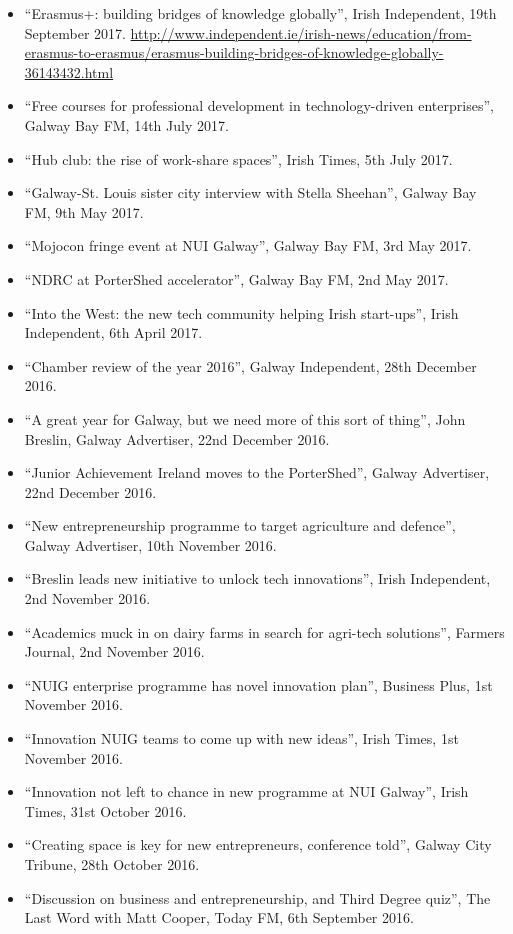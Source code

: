 \documentclass[10pt,a4paper]{res} %
\begin{document}
\begin{resume}
{\begin{itemize}
\item ``Erasmus+: building bridges of knowledge globally'', Irish Independent, 19th September 2017. \url{http://www.independent.ie/irish-news/education/from-erasmus-to-erasmus/erasmus-building-bridges-of-knowledge-globally-36143432.html}
\item ``Free courses for professional development in technology-driven enterprises'', Galway Bay FM, 14th July 2017.
\item ``Hub club: the rise of work-share spaces'', Irish Times, 5th July 2017.
\item ``Galway-St. Louis sister city interview with Stella Sheehan'', Galway Bay FM, 9th May 2017.
\item ``Mojocon fringe event at NUI Galway'', Galway Bay FM, 3rd May 2017.
\item ``NDRC at PorterShed accelerator'', Galway Bay FM, 2nd May 2017.
\item ``Into the West: the new tech community helping Irish start-ups'', Irish Independent, 6th April 2017.
\item ``Chamber review of the year 2016'', Galway Independent, 28th December 2016.
\item ``A great year for Galway, but we need more of this sort of thing'', John Breslin, Galway Advertiser, 22nd December 2016.
\item ``Junior Achievement Ireland moves to the PorterShed'', Galway Advertiser, 22nd December 2016.
\item ``New entrepreneurship programme to target agriculture and defence'', Galway Advertiser, 10th November 2016.
\item ``Breslin leads new initiative to unlock tech innovations'', Irish Independent, 2nd November 2016.
\item ``Academics muck in on dairy farms in search for agri-tech solutions'', Farmers Journal, 2nd November 2016.
\item ``NUIG enterprise programme has novel innovation plan'', Business Plus, 1st November 2016.
\item ``Innovation NUIG teams to come up with new ideas'', Irish Times, 1st November 2016.
\item ``Innovation not left to chance in new programme at NUI Galway'', Irish Times, 31st October 2016.
\item ``Creating space is key for new entrepreneurs, conference told'', Galway City Tribune, 28th October 2016.
\item ``Discussion on business and entrepreneurship, and Third Degree quiz'', The Last Word with Matt Cooper, Today FM, 6th September 2016.

\end{itemize}}
\end{resume}
\end{document}
